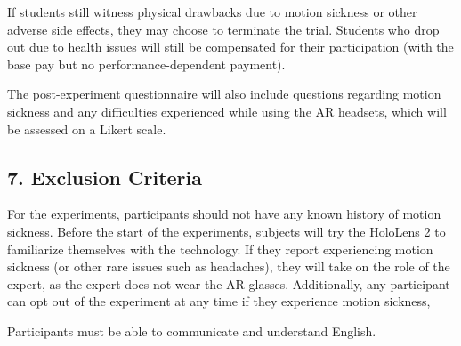 \documentclass[A4,11pt]{article}
\begin{document}
If students still witness physical drawbacks due to motion sickness or other adverse side effects, they may choose to terminate the trial. Students who drop out due to health issues will still be compensated for their participation (with the base pay but no performance-dependent payment).

The post-experiment questionnaire will also include questions regarding motion sickness and any difficulties experienced while using the AR headsets, which will be assessed on a Likert scale.

\subsection*{7. Exclusion Criteria}
For the experiments, participants should not have any known history of motion sickness. Before the start of the experiments, subjects will try the HoloLens 2 to familiarize themselves with the technology. If they report experiencing motion sickness (or other rare issues such as headaches), they will take on the role of the expert, as the expert does not wear the AR glasses. Additionally, any participant can opt out of the experiment at any time if they experience motion sickness, 

Participants must be able to communicate and understand English.
\end{document}
